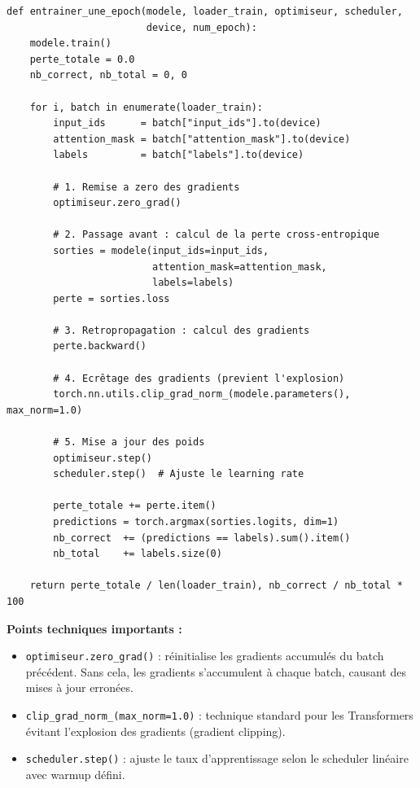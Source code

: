 \begin{lstlisting}[style=stylePython, caption={Boucle d'entraînement fine-tuning CamemBERT}, label={lst:training}]
def entrainer_une_epoch(modele, loader_train, optimiseur, scheduler,
                        device, num_epoch):
    modele.train()
    perte_totale = 0.0
    nb_correct, nb_total = 0, 0

    for i, batch in enumerate(loader_train):
        input_ids      = batch["input_ids"].to(device)
        attention_mask = batch["attention_mask"].to(device)
        labels         = batch["labels"].to(device)

        # 1. Remise a zero des gradients
        optimiseur.zero_grad()

        # 2. Passage avant : calcul de la perte cross-entropique
        sorties = modele(input_ids=input_ids,
                         attention_mask=attention_mask,
                         labels=labels)
        perte = sorties.loss

        # 3. Retropropagation : calcul des gradients
        perte.backward()

        # 4. Ecrêtage des gradients (previent l'explosion)
        torch.nn.utils.clip_grad_norm_(modele.parameters(), max_norm=1.0)

        # 5. Mise a jour des poids
        optimiseur.step()
        scheduler.step()  # Ajuste le learning rate

        perte_totale += perte.item()
        predictions = torch.argmax(sorties.logits, dim=1)
        nb_correct  += (predictions == labels).sum().item()
        nb_total    += labels.size(0)

    return perte_totale / len(loader_train), nb_correct / nb_total * 100
\end{lstlisting}

\textbf{Points techniques importants :}
\begin{itemize}
  \item \texttt{optimiseur.zero\_grad()} : réinitialise les gradients
        accumulés du batch précédent. Sans cela, les gradients s'accumulent
        à chaque batch, causant des mises à jour erronées.
  \item \texttt{clip\_grad\_norm\_(max\_norm=1.0)} : technique standard pour
        les Transformers évitant l'explosion des gradients (gradient clipping).
  \item \texttt{scheduler.step()} : ajuste le taux d'apprentissage selon
        le scheduler linéaire avec warmup défini.
\end{itemize}

